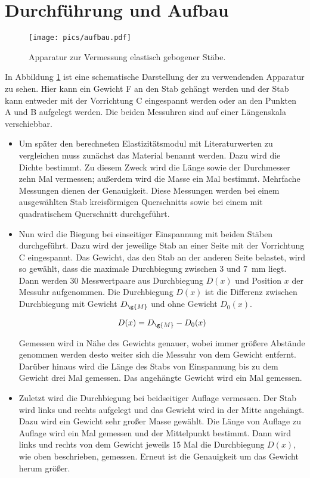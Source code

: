 \section{Durchführung und Aufbau}
\label{sec:Durchführung}

\begin{figure}[h]
  \centering
  \texttt{[image: pics/aufbau.pdf]}
  \caption{Apparatur zur Vermessung elastisch gebogener Stäbe\cite{anleitung}.}
  \label{fig:aufbau}
\end{figure}

In Abbildung \ref{fig:aufbau} ist eine schematische Darstellung der zu
verwendenden Apparatur zu sehen. Hier kann ein Gewicht F an den Stab gehängt
werden und der Stab kann entweder mit der Vorrichtung C eingespannt werden oder
an den Punkten A und B aufgelegt werden. Die beiden Messuhren sind auf einer
Längenskala verschiebbar.

\begin{itemize}
  \item Um später den berechneten Elastizitätsmodul mit Literaturwerten zu
  vergleichen muss zunächst das Material benannt werden.
  Dazu wird die Dichte bestimmt. Zu diesem Zweck wird die Länge sowie der
  Durchmesser zehn Mal vermessen; außerdem wird die Masse ein Mal bestimmt.
  Mehrfache Messungen dienen der Genauigkeit.
  Diese Messungen werden bei einem ausgewählten Stab kreisförmigen
  Querschnitts sowie bei einem mit quadratischem Querschnitt durchgeführt.

  \item Nun wird die Biegung bei einseitiger Einspannung mit beiden
  Stäben durchgeführt. Dazu wird der jeweilige Stab an einer Seite mit der
  Vorrichtung C eingespannt. Das Gewicht, das den Stab an der anderen
  Seite belastet, wird so gewählt, dass die maximale Durchbiegung zwischen
  3 und \SI{7}{\milli\meter} liegt.
  Dann werden 30 Messwertpaare aus Durchbiegung $D(x)$ und Position $x$ der Messuhr
  aufgenommen. Die Durchbiegung $D(x)$ ist die Differenz zwischen
  Durchbiegung mit Gewicht $D_{\g{M}}$ und ohne Gewicht $D_0(x)$.

  \begin{equation*}
    D(x) = D_{\g{M}} - D_0(x)
  \end{equation*}

  Gemessen wird in Nähe des Gewichts genauer, wobei immer größere Abstände
  genommen werden desto weiter sich die Messuhr von dem Gewicht entfernt.
  Darüber hinaus wird die Länge des Stabs von Einspannung bis zu dem
  Gewicht drei Mal gemessen. Das angehängte Gewicht wird ein Mal gemessen.

  \item Zuletzt wird die Durchbiegung bei beidseitiger Auflage vermessen.
  Der Stab wird links und rechts aufgelegt und das Gewicht wird in der Mitte
  angehängt. Dazu wird ein Gewicht sehr großer Masse gewählt. Die Länge
  von Auflage zu Auflage wird ein Mal gemessen und der Mittelpunkt
  bestimmt. Dann wird links und rechts von dem Gewicht jeweils 15 Mal
  die Durchbiegung $D(x)$, wie oben beschrieben, gemessen. Erneut ist
  die Genauigkeit um das Gewicht herum größer.


\end{itemize}
